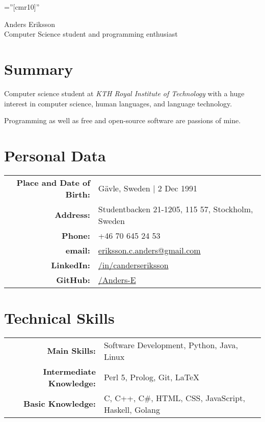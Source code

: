 \documentclass[a4paper,10pt]{article}
\begin{document}
\pagestyle{empty} %

\font\fb=''[cmr10]'' %

\par{
    \centering
	{
	    \Huge \bitter Anders Eriksson \\
	    \normalfont
	    \normalsize Computer Science student and programming enthusiast
	}
	\bigskip\par
}

\section{Summary}
Computer science student at \emph{KTH Royal Institute of Technology} with a huge interest in computer science, human languages, and language technology.

Programming as well as free and open-source software are passions of mine.

\section{Personal Data}

\begin{tabular}{rl}
    \textbf{Place and Date of Birth:} & G{\"a}vle, Sweden  | 2 Dec 1991 \\
    \textbf{Address:}   & Studentbacken 21-1205, 115 57, Stockholm, Sweden \\
    \textbf{Phone:}     & +46 70 645 24 53\\
    \textbf{email:}     & \href{mailto:eriksson.c.anders@gmail.com
}{eriksson.c.anders@gmail.com}\\
    \textbf{LinkedIn:}	& \href{http://se.linkedin.com/in/canderseriksson}{/in/canderseriksson}\\
    \textbf{GitHub:}	& \href{http://github.com/Anders-E}{/Anders-E}
\end{tabular}

\section{Technical Skills}
\begin{tabular}{rl}
\textbf{Main Skills:}& Software Development, Python, Java, Linux \\
\textbf{Intermediate Knowledge:}& Perl 5, Prolog, Git, \LaTeX\\
\textbf{Basic Knowledge:}& C, C++, C\#, HTML, CSS, JavaScript, Haskell, Golang \\
\end{tabular}
\end{document}
